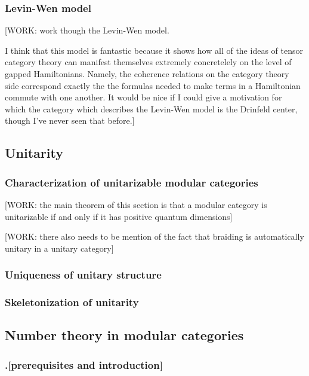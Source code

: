 \subsubsection{Levin-Wen model}

[WORK: work though the Levin-Wen model.

I think that this model is fantastic because it shows how all of the ideas of tensor category theory can manifest themselves extremely concretelely on the level of gapped Hamiltonians. Namely, the coherence relations on the category theory side correspond exactly the the formulas needed to make terms in a Hamiltonian commute with one another. It would be nice if I could give a motivation for which the category which describes the Levin-Wen model is the Drinfeld center, though I've never seen that before.]




\subsection{Unitarity}

\subsubsection{Characterization of unitarizable modular categories}

[WORK: the main theorem of this section is that a modular category is unitarizable if and only if it has positive quantum dimensions]

[WORK: there also needs to be mention of the fact that braiding is automatically unitary in a unitary category]

\subsubsection{Uniqueness of unitary structure}

\subsubsection{Skeletonization of unitarity}




\subsection{Number theory in modular categories}

\subsubsection{.[prerequisites and introduction]}

